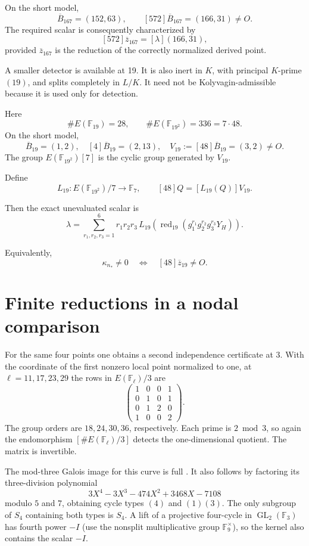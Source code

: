 \documentclass[11pt]{article}
\begin{document}
On the short model,
\[
 \overline B_{167}=(152,63),\qquad
 [572]\overline B_{167}=(166,31)\ne O.
\]
The required scalar is consequently
characterized by
\[
 [572]\overline z_{167}
    =[\lambda](166,31),
\]
provided $\overline z_{167}$ is the reduction
of the correctly normalized derived point.

A smaller detector is available at 19.
It is also inert in $K$, with principal
$K$-prime $(19)$, and splits completely in
$L/K$. It need not be Kolyvagin-admissible
because it is used only for detection.

Here
\[
 \#E(\mathbb F_{19})=28,\qquad
 \#E(\mathbb F_{19^2})=336=7\cdot48.
\]
On the short model,
\[
 \overline B_{19}=(1,2),\quad
 [4]\overline B_{19}=(2,13),\quad
 V_{19}:=[48]\overline B_{19}=(3,2)\ne O.
\]
The group $E(\mathbb F_{19^2})[7]$ is the
cyclic group generated by $V_{19}$.

Define
\[
 L_{19}:E(\mathbb F_{19^2})/7
           \longrightarrow\mathbb F_7,
 \qquad
 [48]Q=[L_{19}(Q)]V_{19}.
\]

Then the exact unevaluated scalar is
\[
 \boxed{
 \lambda=
 \sum_{r_1,r_2,r_3=1}^{6}
 r_1r_2r_3\,
 L_{19}\!\left(
 \operatorname{red}_{19}
 (g_1^{r_1}g_2^{r_2}g_3^{r_3}Y_H)
 \right).
 }
\]

Equivalently,
\[
 \kappa_{n_*}\ne0
 \quad\Longleftrightarrow\quad
 [48]\overline z_{19}\ne O.
\]

\section{Finite reductions in a nodal comparison}

For the same four points one obtains a second independence
certificate at $3$. With the coordinate of the first nonzero local
point normalized to one, at $\ell=11,17,23,29$ the rows in
$E(\mathbb F_\ell)/3$ are
\[
 \begin{pmatrix}
 1&0&0&1\\0&1&0&1\\0&1&2&0\\1&0&0&2
 \end{pmatrix}.
\]
The group orders are $18,24,30,36$, respectively. Each prime is
$2\bmod3$, so again the endomorphism $[\#E(\mathbb F_\ell)/3]$
detects the one-dimensional quotient. The matrix is invertible.

The mod-three Galois image for this curve is full \cite{LMFDB}.
It also follows by factoring its three-division polynomial
\[
 3X^4-3X^3-474X^2+3468X-7108
\]
modulo $5$ and $7$, obtaining cycle types $(4)$ and $(1)(3)$.
The only subgroup of $S_4$ containing both types is $S_4$.
A lift of a projective four-cycle in $\operatorname{GL}_2(\mathbb F_3)$
has fourth power $-I$ (use the nonsplit multiplicative group
$\mathbb F_9^\times$), so the kernel also contains the scalar $-I$.
\end{document}
